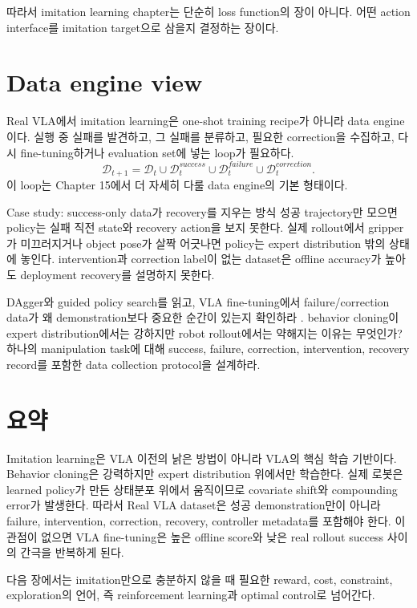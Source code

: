 따라서 imitation learning chapter는 단순히 loss function의 장이 아니다. 어떤 action interface를 imitation target으로 삼을지 결정하는 장이다.

\section{Data engine view}

Real VLA에서 imitation learning은 one-shot training recipe가 아니라 data engine이다. 실행 중 실패를 발견하고, 그 실패를 분류하고, 필요한 correction을 수집하고, 다시 fine-tuning하거나 evaluation set에 넣는 loop가 필요하다.
\begin{equation}
  \mathcal{D}_{t+1}
  =
  \mathcal{D}_{t}
  \cup
  \mathcal{D}^{success}_{t}
  \cup
  \mathcal{D}^{failure}_{t}
  \cup
  \mathcal{D}^{correction}_{t}.
  \label{eq:data-engine-update}
\end{equation}
이 loop는 Chapter 15에서 더 자세히 다룰 data engine의 기본 형태이다.

\begin{casebox}{Case study: success-only data가 recovery를 지우는 방식}
성공 trajectory만 모으면 policy는 실패 직전 state와 recovery action을 보지 못한다. 실제 rollout에서 gripper가 미끄러지거나 object pose가 살짝 어긋나면 policy는 expert distribution 밖의 상태에 놓인다. intervention과 correction label이 없는 dataset은 offline accuracy가 높아도 deployment recovery를 설명하지 못한다.
\end{casebox}

\chapterwork
{DAgger와 guided policy search를 읽고, VLA fine-tuning에서 failure/correction data가 왜 demonstration보다 중요한 순간이 있는지 확인하라 \cite{ross2011dagger,levine2016gps}.}
{behavior cloning이 expert distribution에서는 강하지만 robot rollout에서는 약해지는 이유는 무엇인가?}
{하나의 manipulation task에 대해 success, failure, correction, intervention, recovery record를 포함한 data collection protocol을 설계하라.}

\section{요약}

Imitation learning은 VLA 이전의 낡은 방법이 아니라 VLA의 핵심 학습 기반이다. Behavior cloning은 강력하지만 expert distribution 위에서만 학습한다. 실제 로봇은 learned policy가 만든 상태분포 위에서 움직이므로 covariate shift와 compounding error가 발생한다. 따라서 Real VLA dataset은 성공 demonstration만이 아니라 failure, intervention, correction, recovery, controller metadata를 포함해야 한다. 이 관점이 없으면 VLA fine-tuning은 높은 offline score와 낮은 real rollout success 사이의 간극을 반복하게 된다.

다음 장에서는 imitation만으로 충분하지 않을 때 필요한 reward, cost, constraint, exploration의 언어, 즉 reinforcement learning과 optimal control로 넘어간다.
